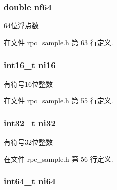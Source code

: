 \subsubsection[{nf64}]{\setlength{\rightskip}{0pt plus 5cm}double nf64}\label{structrpc__sample_1_1my__object__t_ab1cd61707e68d246e0096f4275c0d138}


64位浮点数 



在文件 rpc\+\_\+sample.\+h 第 63 行定义.

\hypertarget{structrpc__sample_1_1my__object__t_ae8b3700159b74a9b7d2ec0a7ea827ed4}{}
\subsubsection[{ni16}]{\setlength{\rightskip}{0pt plus 5cm}int16\+\_\+t ni16}\label{structrpc__sample_1_1my__object__t_ae8b3700159b74a9b7d2ec0a7ea827ed4}


有符号16位整数 



在文件 rpc\+\_\+sample.\+h 第 55 行定义.

\hypertarget{structrpc__sample_1_1my__object__t_a93e8e1b4ecdf7dab9db55ecfe51344cc}{}
\subsubsection[{ni32}]{\setlength{\rightskip}{0pt plus 5cm}int32\+\_\+t ni32}\label{structrpc__sample_1_1my__object__t_a93e8e1b4ecdf7dab9db55ecfe51344cc}


有符号32位整数 



在文件 rpc\+\_\+sample.\+h 第 56 行定义.

\hypertarget{structrpc__sample_1_1my__object__t_a65d691fd650bea991337c5c966f5203e}{}
\subsubsection[{ni64}]{\setlength{\rightskip}{0pt plus 5cm}int64\+\_\+t ni64}\label{structrpc__sample_1_1my__object__t_a65d691fd650bea991337c5c966f5203e}


